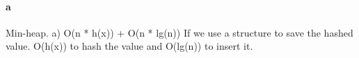 \paragraph{a}
Min-heap.
a) 
O(n * h(x)) + O(n * lg(n)) If we use a structure to save the hashed value. 
O(h(x)) to hash the value and O(lg(n)) to insert it.
